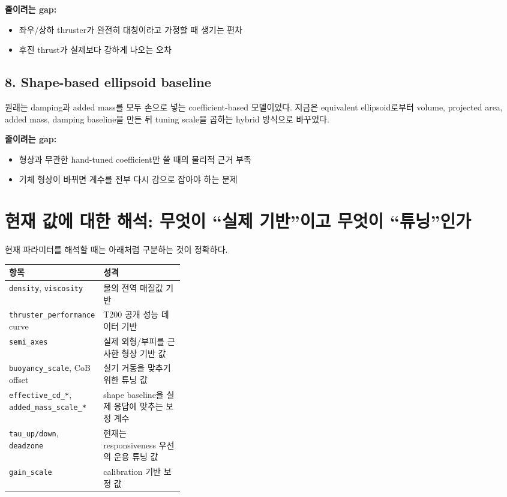 \documentclass[11pt,a4paper]{article}
\newcommand{\code}[1]{\nolinkurl{#1}}
\begin{document}
\textbf{줄이려는 gap:}

\begin{itemize}[leftmargin=2em]
  \item 좌우/상하 thruster가 완전히 대칭이라고 가정할 때 생기는 편차
  \item 후진 thrust가 실제보다 강하게 나오는 오차
\end{itemize}

\subsection{8. Shape-based ellipsoid baseline}

원래는 damping과 added mass를 모두 손으로 넣는 coefficient-based 모델이었다. 지금은 equivalent ellipsoid로부터 volume, projected area, added mass, damping baseline을 만든 뒤 tuning scale을 곱하는 hybrid 방식으로 바꾸었다.

\textbf{줄이려는 gap:}

\begin{itemize}[leftmargin=2em]
  \item 형상과 무관한 hand-tuned coefficient만 쓸 때의 물리적 근거 부족
  \item 기체 형상이 바뀌면 계수를 전부 다시 감으로 잡아야 하는 문제
\end{itemize}

\section{현재 값에 대한 해석: 무엇이 ``실제 기반''이고 무엇이 ``튜닝''인가}

현재 파라미터를 해석할 때는 아래처럼 구분하는 것이 정확하다.

\begin{center}
\small
\begin{tabularx}{\linewidth}{>{\raggedright\arraybackslash}p{0.34\linewidth}Y}
\toprule
항목 & 성격 \\
\midrule
\code{density}, \code{viscosity} & 물의 전역 매질값 기반 \\
\code{thruster_performance} curve & T200 공개 성능 데이터 기반 \\
\code{semi_axes} & 실제 외형/부피를 근사한 형상 기반 값 \\
\code{buoyancy_scale}, CoB offset & 실기 거동을 맞추기 위한 튜닝 값 \\
\code{effective_cd_*}, \code{added_mass_scale_*} & shape baseline을 실제 응답에 맞추는 보정 계수 \\
\code{tau_up/down}, \code{deadzone} & 현재는 responsiveness 우선의 운용 튜닝 값 \\
\code{gain_scale} & calibration 기반 보정 값 \\
\bottomrule
\end{tabularx}
\end{center}
\end{document}
